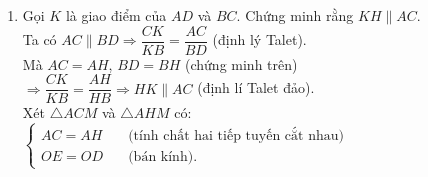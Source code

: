 \begin{bt}
{\begin{enumerate}
			$\Leftrightarrow \widehat {HMA} = \dfrac{1}{2} \widehat {CMH}$.\\
			Tương tự ta có $\widehat {HMB} = \dfrac{1}{2} \widehat {DMH}$.\\
			Suy ra \begin{eqnarray*}
				& & \widehat {HMA} + \widehat {HMB} = \dfrac{1}{2} \widehat {CMH} + \dfrac{1}{2} \widehat {DMH}\\
				& \Leftrightarrow &  \widehat {AMB} = \dfrac{1}{2} \widehat {DMC}\\
				& \Leftrightarrow & \widehat {CMD} = 180^\circ\\
				& \Leftrightarrow & C, D, M \quad \text{thẳng hàng.}
			\end{eqnarray*}
			Suy ra $M$ là trung điểm của $CD$ hay tứ giác $ACDB$ là hình thang vuông, đáy $AC, BD$.\\
			Mặt khác $AC$ và $BD$ là tiếp tuyến của $(M)$ (giả thiết)\\
			$\Leftrightarrow AC\perp CD; BD\perp CD \Leftrightarrow AC\parallel BD$.\\
			Lại có $O$ là trung điểm của $AB$ nên $OM$ là đường trung bình của hình thang $ACDB$ suy ra $OM\parallel BD$.\\
			$OM\perp CD \Leftrightarrow CD$ là tiếp tuyến của $(O)$ (điều phải chứng minh).
			\item Gọi $K$ là giao điểm của $AD$ và $BC$. Chứng minh rằng $KH \parallel AC$.\\
			Ta có $AC \parallel BD \Rightarrow \dfrac{CK}{KB} = \dfrac{AC}{BD}$ (định lý Talet).\\
			Mà $AC=AH$, $BD=BH$ (chứng minh trên)\\
			$\Rightarrow \dfrac{CK}{KB} = \dfrac{AH}{HB} \Rightarrow HK \parallel AC$ (định lí Talet đảo).\\
			Xét $\triangle ACM$ và $\triangle AHM$ có:
			$\begin{cases}
			AC=AH & \quad \text{(tính chất hai tiếp tuyến cắt nhau)}\\
			OE=OD & \quad \text{(bán kính)}.
			\end{cases}$
		\end{enumerate}
	}
\end{bt}

